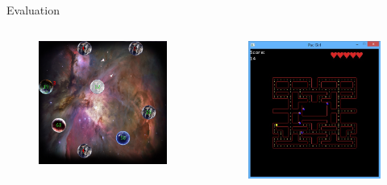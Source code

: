 \documentclass{beamer}
\begin{document}
\begin{frame}[fragile]{Evaluation}
\begin{columns}[c]
\column{1.5in}
\begin{figure}
\includegraphics[scale=0.15]{Pics/RTS.png}
\end{figure}
\begin{figure}
\includegraphics[scale=0.15]{Pics/pacman.jpg}
\end{figure}
\end{columns}
\end{frame}
\end{document}
